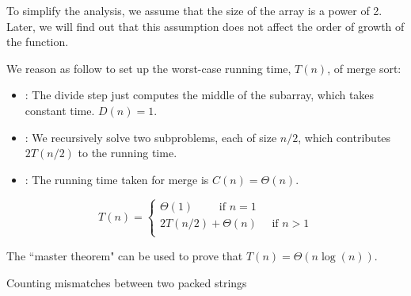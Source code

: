     \par To simplify the analysis, we assume that the size of the array is
      a power of 2. Later, we will find out that this assumption does not
      affect the order of growth of the function.
    \par We reason as follow to set up the worst-case running time, $T(n)$,
      of merge sort:
    \begin{itemize}
      \item {}: The divide step just computes the middle of the
        subarray, which takes constant time. $D(n) = 1$.
      \item {}: We recursively solve two subproblems, each of
        size $n/2$, which contributes $2T(n/2)$ to the running time.
      \item {}: The running time taken for merge is
        $C(n) = \Theta(n)$.
    \end{itemize}
    \begin{equation}
      T(n) = \begin{cases}
        \Theta(1) \qquad \mbox{ if } n = 1 \\
        2T(n/2) + \Theta(n) \quad \mbox{ if } n > 1 \\
      \end{cases}
    \end{equation}
    \par The ``master theorem" can be used to prove that
      $T(n) = \Theta(n\log(n))$.

\clearpage
  \begin{algorithm}
    \caption{Counting mismatches between two packed \DNA{} strings
      \label{alg:packed-dna-hamming}}
    \begin{algorithmic}[1]
      \Statex
         
          \EndIf
        \EndFor
        \State \Return{$\delta$}
      \EndFunction
    \end{algorithmic}
  \end{algorithm}
